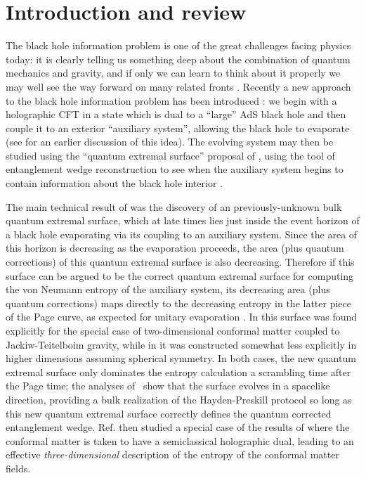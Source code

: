 \documentclass[12pt]{article}
\theoremstyle{definition}
\begin{document}
\section{Introduction and review}
The black hole information problem is one of the great challenges facing physics today: it is clearly telling us something deep about the combination of quantum mechanics and gravity, and if only we can learn to think about it properly we may well see the way forward on many related fronts \cite{Hawking:1976ra,Harlow:2014yka,Marolf:2017jkr}.  Recently a new approach to the black hole information problem has been introduced \cite{Almheiri:2019psf,Penington:2019npb,Almheiri:2019hni}: we begin with a holographic CFT in a state which is dual to a ``large'' AdS black hole and then couple it to an exterior ``auxiliary system'', allowing the black hole to evaporate (see \cite{Rocha:2008fe} for an earlier discussion of this idea).  The evolving system may then be studied using the ``quantum extremal surface'' proposal of \cite{Engelhardt:2014gca}, using the tool of entanglement wedge reconstruction \cite{Czech:2012bh,Wall:2012uf,Headrick:2014cta,Jafferis:2015del,Dong:2016eik} to see when the auxiliary system begins to contain information about the black hole interior \cite{Almheiri:2019psf,Penington:2019npb,Almheiri:2019hni}.

The main technical result of \cite{Almheiri:2019psf,Penington:2019npb} was the discovery of an previously-unknown bulk quantum extremal surface, which at late times lies just inside the event horizon of a black hole evaporating via its coupling to an auxiliary system.  Since the area of this horizon is decreasing as the evaporation proceeds, the area (plus quantum corrections) of this quantum extremal surface is also decreasing.  Therefore if this surface can be argued to be the correct quantum extremal surface for computing the von Neumann entropy of the auxiliary system, its decreasing area (plus quantum corrections) maps directly to the decreasing entropy in the latter piece of the Page curve, as expected for unitary evaporation \cite{Almheiri:2019psf,Penington:2019npb}.  In \cite{Almheiri:2019psf} this surface was found explicitly for the special case of two-dimensional conformal matter coupled to Jackiw-Teitelboim gravity, while in \cite{Penington:2019npb} it was constructed somewhat less explicitly in higher dimensions assuming spherical symmetry.  In both cases, the new quantum extremal surface only dominates the entropy calculation a scrambling time after the Page time; the analyses of~\cite{Almheiri:2019psf,Penington:2019npb} show that the surface evolves in a spacelike direction, providing a bulk realization of the Hayden-Preskill protocol so long as this new quantum extremal surface correctly defines the quantum corrected entanglement wedge. Ref. \cite{Almheiri:2019hni} then studied a special case of the results of \cite{Almheiri:2019psf} where the conformal matter is taken to have a semiclassical holographic dual, leading to an effective \textit{three-dimensional} description of the entropy of the conformal matter fields.  
\end{document}
